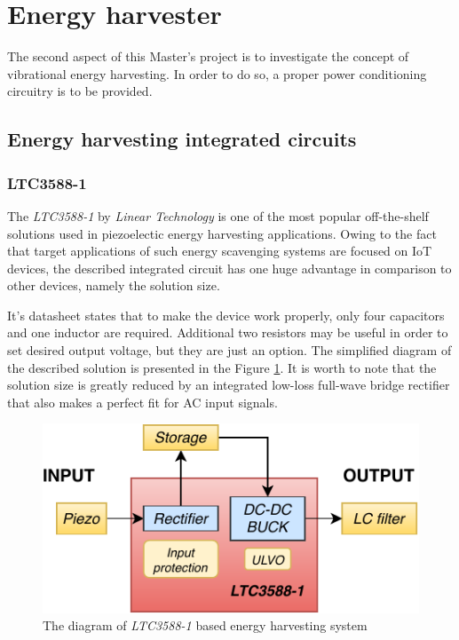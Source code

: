 \documentclass[12pt,a4paper]{article}
\begin{document}
\section{Energy harvester}
The second aspect of this Master's project is to investigate the concept of vibrational energy harvesting. In order to do so, a proper power conditioning circuitry is to be provided.

\subsection{Energy harvesting integrated circuits}
\subsubsection{LTC3588-1}
The \textit{LTC3588-1} by \textit{Linear Technology} is one of the most popular off-the-shelf solutions used in piezoelectic energy harvesting applications. Owing to the fact that target applications of such energy scavenging systems are focused on IoT devices, the described integrated circuit has one huge advantage in comparison to other devices, namely the solution size.
\par
It's datasheet \cite{ltc3588_params} states that to make the device work properly, only four capacitors and one inductor are required. Additional two resistors may be useful in order to set desired output voltage, but they are just an option. The simplified diagram of the described solution is presented in the Figure \ref{fig:ltc3588diagram}. It is worth to note that the solution size is greatly reduced by an integrated low-loss full-wave bridge rectifier that also makes a perfect fit for AC input signals.

\begin{figure}[ht!]
\includegraphics[scale=1.2]{LTC3588.pdf}
\caption{The diagram of \textit{LTC3588-1} based energy harvesting system}
\label{fig:ltc3588diagram}
\end{figure}
\end{document}
